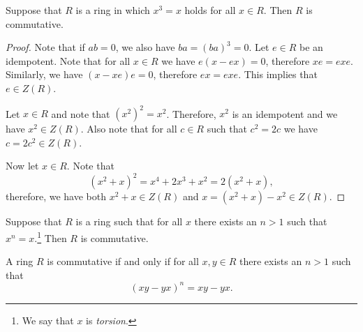 \begin{trditev}
Suppose that $R$ is a ring in which $x^3 = x$ holds for all
$x \in R$. Then $R$ is commutative.
\end{trditev}

\begin{proof}
Note that if $ab = 0$, we also have $ba = (ba)^3 = 0$. Let
$e \in R$ be an idempotent. Note that for all $x \in R$ we have
$e (x - ex) = 0$, therefore $xe = exe$. Similarly, we have
$(x - xe) e = 0$, therefore $ex = exe$. This implies that
$e \in Z(R)$.

Let $x \in R$ and note that $(x^2)^2 = x^2$. Therefore, $x^2$ is an
idempotent and we have $x^2 \in Z(R)$. Also note that for all
$c \in R$ such that $c^2 = 2c$ we have $c = 2c^2 \in Z(R)$.

Now let $x \in R$. Note that
\[
(x^2 + x)^2 = x^4 + 2x^3 + x^2 = 2(x^2 + x),
\]
therefore, we have both $x^2 + x \in Z(R)$ and
$x = (x^2 + x) - x^2 \in Z(R)$.
\end{proof}

\begin{izrek}[Jacobson]
Suppose that $R$ is a ring such that for all $x$ there exists an
$n > 1$ such that $x^n = x$.\footnote{We say that $x$ is
\emph{torsion}.} Then $R$ is commutative.
\end{izrek}

\begin{izrek}
A ring $R$ is commutative if and only if for all $x, y \in R$
there exists an $n > 1$ such that
\[
(xy - yx)^n = xy - yx.
\]
\end{izrek}


